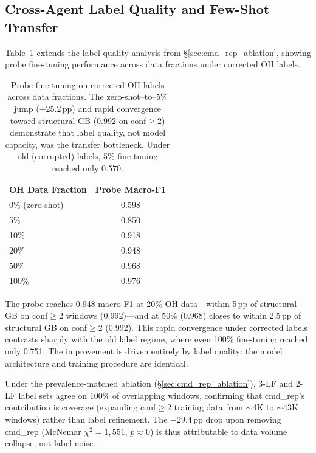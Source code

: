 \subsection{Cross-Agent Label Quality and Few-Shot Transfer}
\label{sec:app_cmdrep}

Table~\ref{tab:cross_agent_cmdrep} extends the label quality analysis from \S\ref{sec:cmd_rep_ablation}, showing probe fine-tuning performance across data fractions under corrected OH labels.

\begin{table}[h]
\centering
\small
\begin{tabular}{lc}
\toprule
\textbf{OH Data Fraction} & \textbf{Probe Macro-F1} \\
\midrule
0\% (zero-shot) & 0.598 \\
5\% & 0.850 \\
10\% & 0.918 \\
20\% & 0.948 \\
50\% & 0.968 \\
100\% & 0.976 \\
\bottomrule
\end{tabular}
\caption{Probe fine-tuning on corrected OH labels across data fractions. The zero-shot--to--5\% jump ($+$25.2\,pp) and rapid convergence toward structural GB (0.992 on conf${\geq}$2) demonstrate that label quality, not model capacity, was the transfer bottleneck. Under old (corrupted) labels, 5\% fine-tuning reached only 0.570.}
\label{tab:cross_agent_cmdrep}
\end{table}

The probe reaches 0.948 macro-F1 at 20\% OH data---within 5\,pp of structural GB on conf${\geq}$2 windows (0.992)---and at 50\% (0.968) closes to within 2.5\,pp of structural GB on conf${\geq}$2 (0.992).
This rapid convergence under corrected labels contrasts sharply with the old label regime, where even 100\% fine-tuning reached only 0.751.
The improvement is driven entirely by label quality: the model architecture and training procedure are identical.

Under the prevalence-matched ablation (\S\ref{sec:cmd_rep_ablation}), 3-LF and 2-LF label sets agree on 100\% of overlapping windows, confirming that cmd\_rep's contribution is coverage (expanding conf${\geq}$2 training data from ${\sim}$4K to ${\sim}$43K windows) rather than label refinement.
The $-29.4$\,pp drop upon removing cmd\_rep (McNemar $\chi^2{=}1{,}551$, $p{\approx}0$) is thus attributable to data volume collapse, not label noise.

